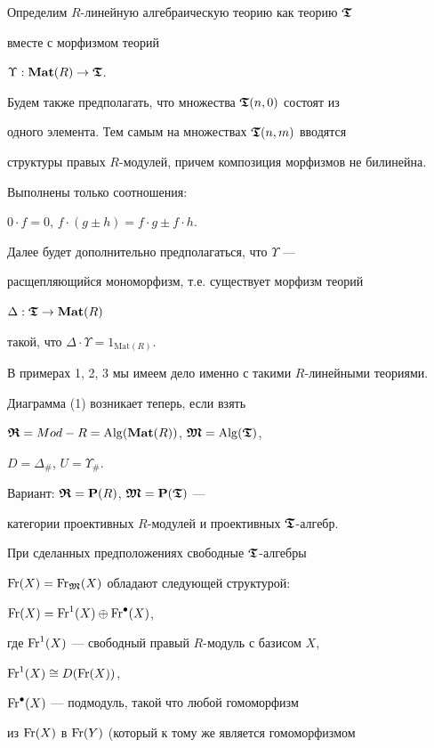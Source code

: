 Определим $R$-линейную алгебраическую теорию как теорию ${\boldsymbol{\frak T}}$


вместе с морфизмом теорий


$\Upsilon : {\bold{Mat}}(R) \to {\boldsymbol{\frak T}}$.


Будем также предполагать, что множества ${\boldsymbol{\frak T}}(n,0)$ состоят из


одного элемента. Тем самым на множествах ${\boldsymbol{\frak T}}(n,m)$ вводятся


структуры правых $R$-модулей, причем композиция морфизмов не билинейна.


Выполнены только соотношения:


$0 \cdot f = 0$, $f\cdot (g \pm h)= f\cdot g \pm f\cdot h$.





Далее будет дополнительно предполагаться, что $\Upsilon$ ---


расщепляющийся мономорфизм, т.е. существует морфизм теорий


$\Delta : {\boldsymbol{\frak T}}\to {\bold{Mat}}(R)$


такой, что $\Delta\cdot\Upsilon = 1_{{\mathrm{Mat}}(R)}$.





В примерах 1, 2, 3 мы имеем дело именно с такими $R$-линейными теориями.


Диаграмма (1) возникает теперь, если взять


$\boldsymbol{\frak R}=Mod-R=\operatorname{Alg}({\bold{Mat}}(R))$, $\boldsymbol{\frak M}=\operatorname{Alg}({\boldsymbol{\frak T}})$,


$D=\Delta_{\#} $, $U=\Upsilon_{\#}$.


Вариант: $\boldsymbol{\frak R}={\bold P}(R)$, $\boldsymbol{\frak M}={\bold P}({\boldsymbol{\frak T}}) $ ---


категории проективных $R$-модулей и проективных ${\boldsymbol{\frak T}}$-алгебр.





При сделанных предположениях свободные ${\boldsymbol{\frak T}}$-алгебры


$\operatorname{Fr}(X)=\operatorname{Fr}_{\boldsymbol{\frak M}}(X)$ обладают следующей структурой:


$\operatorname{Fr}(X)=\operatorname{Fr}^1(X)\oplus\operatorname{Fr}^{\bullet}(X)$,


где $\operatorname{Fr}^1(X)$ --- свободный правый $R$-модуль с базисом $X$,


$\operatorname{Fr}^1(X)\cong D(\operatorname{Fr}(X))$,


$\operatorname{Fr}^{\bullet}(X)$ --- подмодуль, такой что любой гомоморфизм


из $\operatorname{Fr}(X)$ в $\operatorname{Fr}(Y)$ (который к тому же является гомоморфизмом


